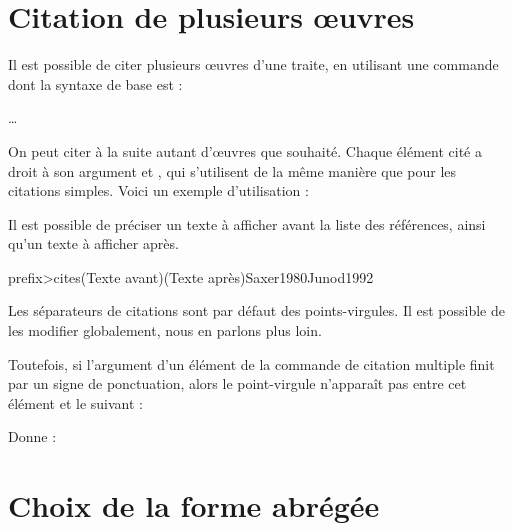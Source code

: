 \section{Citation de plusieurs œuvres}\label{citemultiple}

Il est possible de citer plusieurs œuvres d'une traite, en  utilisant une commande dont la syntaxe de base est :

  …

On peut  citer à la suite autant d'œuvres que souhaité. Chaque élément cité a droit à son argument  et , qui s'utilisent de la même manière que pour les citations simples.
Voici un exemple d'utilisation : 

\begin{latexcode}
\autocites{Saxer1980}{Junod1992}
\end{latexcode}

\begin{quotation}
\cites{Saxer1980}{Junod1992}
\end{quotation}

Il est possible de préciser un texte à afficher avant la liste des références, ainsi qu'un texte à afficher après.

\begin{latexcode}
\<prefix>cites(Texte avant)(Texte après){Saxer1980}{Junod1992}
\end{latexcode}

Les séparateurs de citations sont par défaut des points-virgules. Il est possible de les modifier globalement, nous en parlons plus loin.

Toutefois, si l'argument  d'un élément de la commande de citation multiple finit par un signe de ponctuation, alors le point-virgule n'apparaît pas entre cet élément et le suivant :

\begin{latexcode}
\autocites[on consultera également :]{Saxer1980}{Junod1992}
\end{latexcode}

Donne :

\begin{quotation}
\cites[on consultera également :]{Saxer1980}{Junod1992}
\end{quotation}




\section{Choix de la forme abrégée}\label{shortfields}

